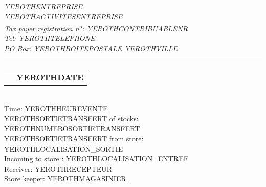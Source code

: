 \documentclass[2pt]{article} %
\makeatletter
\newcommand{\headerrow}[2]
{\begin{tabular*}{\linewidth}{l@{\extracolsep{\fill}}r}
	#1 &
	#2 \\
\end{tabular*}}
\makeatother
\begin{document}
\emph{YEROTHENTREPRISE} \\
\emph{YEROTHACTIVITESENTREPRISE} \\
\emph{Tax payer registration n\textsuperscript{o}: YEROTHCONTRIBUABLENR} \\
\emph{Tel: YEROTHTELEPHONE} \\
\emph{PO Box: YEROTHBOITEPOSTALE YEROTHVILLE}

\vspace*{0.2cm}

\hrule

\headerrow
{}
{\textbf{YEROTHDATE}}\\

Time: YEROTHHEUREVENTE\\
YEROTHSORTIETRANSFERT of stocks: YEROTHNUMEROSORTIETRANSFERT\\
YEROTHSORTIETRANSFERT from store: YEROTHLOCALISATION_SORTIE\\
Incoming to store : YEROTHLOCALISATION_ENTREE\\
Receiver: YEROTHRECEPTEUR\\
Store keeper: YEROTHMAGASINIER.

\vspace*{0.2cm}

\end{document}
